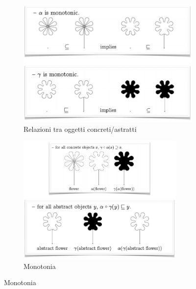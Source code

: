 \documentclass[a4paper,oneside,titlepage]{book}
\begin{document}
\begin{figure}[htp]
	\begin{subfigure}{0.49\textwidth}
	    \centering
		\includegraphics[width=\textwidth, height=\textheight, keepaspectratio]{galConn1.png}
		\caption{Relazioni tra oggetti concreti/astratti}
	\end{subfigure}
	\hfill
	\begin{subfigure}{0.49\textwidth}
	    \centering
		\includegraphics[width=0.9\textwidth]{galConn2.png} 
		\caption{Monotonia}
	\end{subfigure}
\end{figure}
\end{document}
